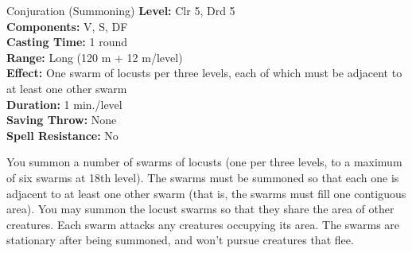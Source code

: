 {Conjuration (Summoning)}
{
	\textbf{Level:}
	Clr 5, Drd 5\\
	\textbf{Components:}
	V, S, DF\\
	\textbf{Casting Time:}
	1 round\\
	\textbf{Range:}
	Long (120 m + 12 m/level)\\
	\textbf{Effect:}
	One swarm of locusts per three levels, each of which must be adjacent to at least one other swarm\\
	\textbf{Duration:}
	1 min./level\\
	\textbf{Saving Throw:}
	None\\
	\textbf{Spell Resistance:}
	No\\
}
{
	You summon a number of swarms of locusts (one per three levels, to a maximum of six swarms at 18th level). The swarms must be summoned so that each one is adjacent to at least one other swarm (that is, the swarms must fill one contiguous area). You may summon the locust swarms so that they share the area of other creatures. Each swarm attacks any creatures occupying its area. The swarms are stationary after being summoned, and won't pursue creatures that flee.

}

